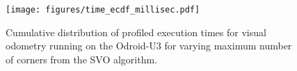\begin{figure}[htbp]
  \centering
  \texttt{[image: figures/time\_ecdf\_millisec.pdf]}
  \caption{Cumulative distribution of profiled execution times for visual odometry running on the Odroid-U3 for varying maximum number of corners from the SVO algorithm.}
  \label{fig:time_ecdf}
\end{figure}






